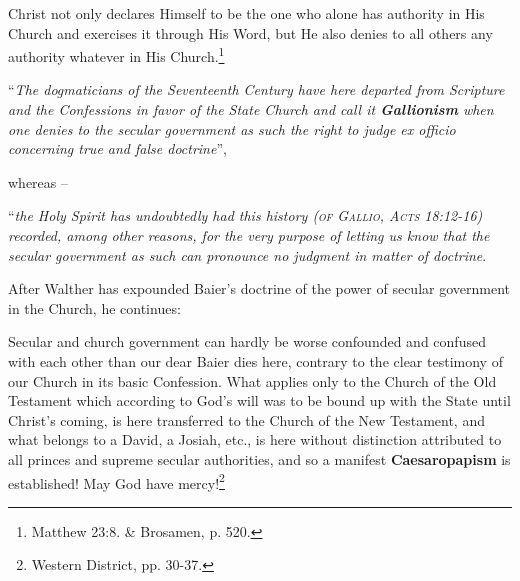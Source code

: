 \begin{fancyquotes}
                Christ not only declares Himself to be the one who alone has authority in His Church and exercises it through His Word, but He also denies to all others any authority whatever in His Church.\footnote{Matthew 23:8. \& Brosamen, p. 520.}\end{fancyquotes} \begin{displayquote}“\textit{The dogmaticians of the Seventeenth Century have here departed from Scripture and the Confessions in favor of the State Church and call it \textbf{Gallionism} when one denies to the secular government as such the right to judge \textit{ex officio} concerning true and false doctrine}”,\end{displayquote} whereas -- \begin{displayquote}“\textit{the Holy Spirit has undoubtedly had this history {\scriptsize\textsc{(of Gallio, Acts 18:12-16)}} recorded, among other reasons, for the very purpose of letting us know that the secular government as such can pronounce no judgment in matter of doctrine}.\end{displayquote}  After Walther has expounded Baier’s doctrine of the power of secular government in the Church, he continues: \begin{fancyquotes}Secular and church government can hardly be worse confounded and confused with each other than our dear Baier dies here, contrary to the clear testimony of our Church in its basic Confession.  What applies only to the Church of the Old Testament which according to God’s will was to be bound up with the State until Christ’s coming, is here transferred to the Church of the New Testament, and what belongs to a David, a Josiah, etc., is here without distinction attributed to all princes and supreme secular authorities, and so a manifest \textbf{Caesaropapism} is established!  May God have mercy!\footnote{Western District, pp. 30-37.}\end{fancyquotes}

